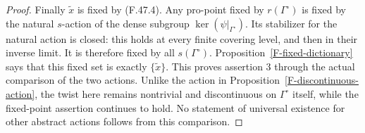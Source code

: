 \documentclass[11pt,oneside]{article}
\begin{document}
\begin{proof}
Finally $\widetilde x$ is fixed by (F.47.4). Any pro-point
fixed by $r(\Gamma^\circ)$ is fixed by the natural
$s$-action of the dense subgroup
$\ker(\psi|_{\Gamma^\circ})$. Its stabilizer for the
natural action is closed: this holds at every finite
covering level, and then in their inverse limit.
It is therefore fixed by all $s(\Gamma^\circ)$.
Proposition~\ref{F-fixed-dictionary} says that this fixed
set is exactly $\{\widetilde x\}$. This proves assertion
3 through the actual comparison of the two actions.
Unlike the action in Proposition~\ref{F-discontinuous-action},
the twist here remains nontrivial and discontinuous on
$\Gamma^\circ$ itself, while the fixed-point assertion
continues to hold. No statement of universal existence
for other abstract actions follows from this comparison.
\end{proof}

\clearpage


\end{document}
